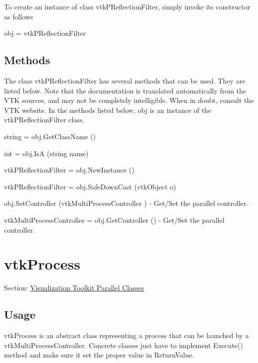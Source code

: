 To create an instance of class vtk\-P\-Reflection\-Filter, simply invoke its constructor as follows \begin{DoxyVerb}  obj = vtkPReflectionFilter
\end{DoxyVerb}
 \hypertarget{vtkwidgets_vtkxyplotwidget_Methods}{}\subsection{Methods}\label{vtkwidgets_vtkxyplotwidget_Methods}
The class vtk\-P\-Reflection\-Filter has several methods that can be used. They are listed below. Note that the documentation is translated automatically from the V\-T\-K sources, and may not be completely intelligible. When in doubt, consult the V\-T\-K website. In the methods listed below, {\ttfamily obj} is an instance of the vtk\-P\-Reflection\-Filter class. 
\begin{DoxyItemize}
\item {\ttfamily string = obj.\-Get\-Class\-Name ()}  
\item {\ttfamily int = obj.\-Is\-A (string name)}  
\item {\ttfamily vtk\-P\-Reflection\-Filter = obj.\-New\-Instance ()}  
\item {\ttfamily vtk\-P\-Reflection\-Filter = obj.\-Safe\-Down\-Cast (vtk\-Object o)}  
\item {\ttfamily obj.\-Set\-Controller (vtk\-Multi\-Process\-Controller )} -\/ Get/\-Set the parallel controller.  
\item {\ttfamily vtk\-Multi\-Process\-Controller = obj.\-Get\-Controller ()} -\/ Get/\-Set the parallel controller.  
\end{DoxyItemize}\hypertarget{vtkparallel_vtkprocess}{}\section{vtk\-Process}\label{vtkparallel_vtkprocess}
Section\-: \hyperlink{sec_vtkparallel}{Visualization Toolkit Parallel Classes} \hypertarget{vtkwidgets_vtkxyplotwidget_Usage}{}\subsection{Usage}\label{vtkwidgets_vtkxyplotwidget_Usage}
vtk\-Process is an abstract class representing a process that can be launched by a vtk\-Multi\-Process\-Controller. Concrete classes just have to implement Execute() method and make sure it set the proper value in Return\-Value.

